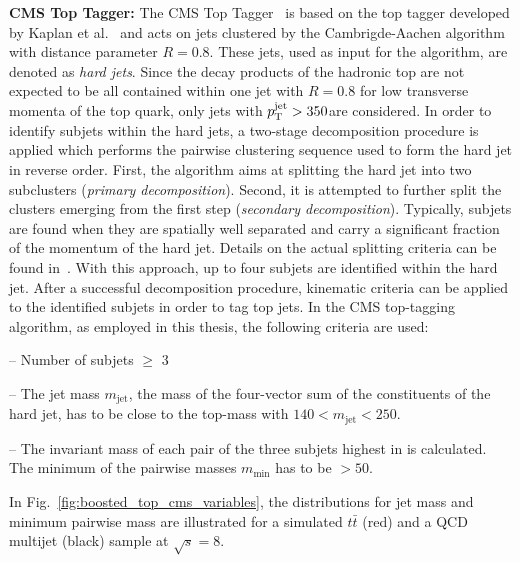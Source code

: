 \begin{description}
 \item \textbf{CMS Top Tagger:} The CMS Top Tagger~\cite{CMS-PAS-JME-09-001} is based on the top tagger developed by Kaplan et al.~\cite{Kaplan:2008ie} and acts on jets clustered by the Cambrigde-Aachen algorithm with distance parameter $R = 0.8$. These jets, used as input for the algorithm, are denoted as \textit{hard jets}. Since the decay products of the hadronic top are not expected to be all contained within one jet with $R = 0.8$ for low transverse momenta of the top quark, only jets with $p_{\text{T}}^\mathrm{jet} > 350$\gev are considered. In order to identify subjets within the hard jets, a two-stage decomposition procedure is applied which performs the pairwise clustering sequence used to form the hard jet in reverse order. First, the algorithm aims at splitting the hard jet into two subclusters (\textit{primary decomposition}). Second, it is attempted to further split the clusters emerging from the first step (\textit{secondary decomposition}). Typically, subjets are found when they are spatially well separated and carry a significant fraction of the momentum of the hard jet. Details on the actual splitting criteria can be found in~\cite{CMS:2014fya}. With this approach, up to four subjets are identified within the hard jet. After a successful decomposition procedure, kinematic criteria can be applied to the identified subjets in order to tag top jets. In the CMS top-tagging algorithm, as employed in this thesis, the following criteria are used:
\begin{description}
 \item -- Number of subjets $\ge$ 3
 \item -- The jet mass $m_{\mathrm{jet}}$, \ie the mass of the four-vector sum of the constituents of the hard jet, has to be close to the top-mass with $140 < m_{\mathrm{jet}} < 250$\gev.
 \item -- The invariant mass of each pair of the three subjets highest in \pt is calculated. The minimum of the pairwise masses $m_{\mathrm{min}}$ has to be $ > 50$\gev.
\end{description}
In Fig.~\ref{fig:boosted_top_cms_variables}, the distributions for jet mass and minimum pairwise mass are illustrated for a simulated $t\bar{t}$ (red) and a QCD multijet (black) sample at $\sqrt{s} = 8$\tev. 

\end{description}
